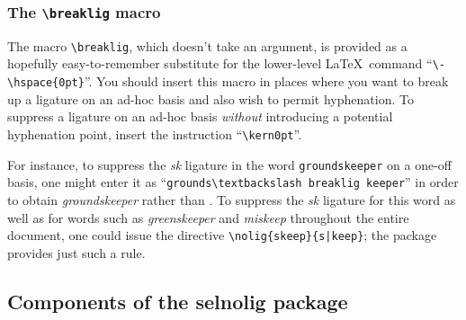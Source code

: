 \documentclass[11pt]{article}
\newcommand{\pkg}[1]{\textsf{#1}}
\newcommand{\cmmd}[1]{\texttt{\textbackslash #1}}
\begin{document}
\subsubsection{The \cmmd{breaklig} macro} 
\label{sec:breaklig}

The macro \cmmd{breaklig}, which doesn't take an argument, is provided as a hopefully easy-to-remember substitute for the lower-level \LaTeX\ command ``\Verb+\-\hspace{0pt}+''. You should insert this macro in places where you want to break up a ligature on an ad-hoc basis and also wish to permit hyphenation. To suppress a ligature on an ad-hoc basis \emph{without} introducing a potential hyphenation point, insert the instruction \enquote{\cmmd{kern0pt}}. 

For instance, to suppress the {\ebg\emph{sk}} ligature in the word \Verb+groundskeeper+ on a one-off basis, one might enter it as \enquote{\Verb+grounds\textbackslash breaklig keeper+} in order to obtain \emph{\ebg groundskeeper} rather than \emph{\ebg {}}. To suppress the {\ebg \emph{sk}} ligature for this word as well as for words such as \emph{\ebg greenskeeper} and \emph{\ebg miskeep} throughout the entire document, one could issue the directive \Verb+\nolig{skeep}{s|keep}+; the package provides just such a rule.




\subsection[Components of the selnolig package]{Components of the \pkg{selnolig} package} 
\label{sec:components}
\end{document}
